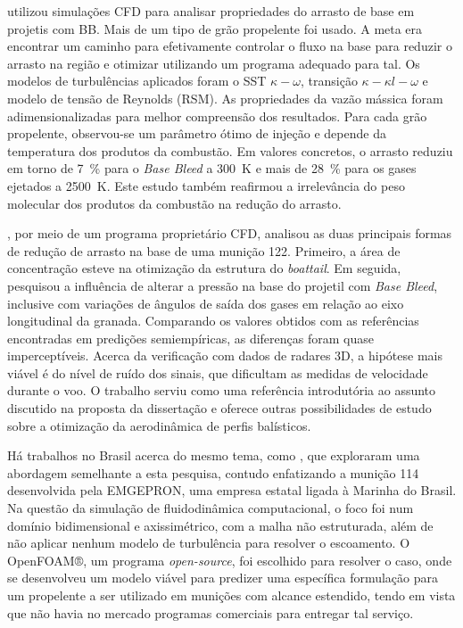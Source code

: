 \citeauthor{Dali2018a} utilizou simulações CFD para analisar propriedades do arrasto de base em projetis com BB. Mais de um tipo de grão propelente foi usado. A meta era encontrar um caminho para efetivamente controlar o fluxo na base para reduzir o arrasto na região e otimizar utilizando um programa adequado para tal. Os modelos de turbulências aplicados foram o SST \(\kappa-\omega\), transição \(\kappa-\kappa l-\omega\) e modelo de tensão de Reynolds (RSM). As propriedades da vazão mássica foram adimensionalizadas para melhor compreensão dos resultados. Para cada grão propelente, observou-se um parâmetro ótimo de injeção e depende da temperatura dos produtos da combustão. Em valores concretos, o arrasto reduziu em torno de \qty{7}{\percent} para o \textit{Base Bleed} a \qty{300}{\kelvin} e mais de \qty{28}{\percent} para os gases ejetados a \qty{2500}{\kelvin}. Este estudo também reafirmou a irrelevância do peso molecular dos produtos da combustão na redução do arrasto.
	
\citeauthor{Dali2018b}, por meio de um programa proprietário CFD, analisou as duas principais formas de redução de arrasto na base de uma munição \qty{122}{\millimetre}. Primeiro, a área de concentração esteve na otimização da estrutura do \textit{boattail}. Em seguida, pesquisou a influência de alterar a pressão na base do projetil com \textit{Base Bleed}, inclusive com variações de ângulos de saída dos gases em relação ao eixo longitudinal da granada. Comparando os valores obtidos com as referências encontradas em predições semiempíricas, as diferenças foram quase imperceptíveis. Acerca da verificação com dados de radares 3D, a hipótese mais viável é do nível de ruído dos sinais, que dificultam as medidas de velocidade durante o voo. O trabalho serviu como uma referência introdutória ao assunto discutido na proposta da dissertação e oferece outras possibilidades de estudo sobre a otimização da aerodinâmica de perfis balísticos. 
	
Há trabalhos no Brasil acerca do mesmo tema, como \cite{Lucena2020,Rosendo2020,Gil2020}, que exploraram uma abordagem semelhante a esta pesquisa, contudo enfatizando a munição \qty{114}{\millimetre} desenvolvida pela EMGEPRON, uma empresa estatal ligada à Marinha do Brasil. Na questão da simulação de fluidodinâmica computacional, o foco foi num domínio bidimensional e axissimétrico, com a malha não estruturada, além de não aplicar nenhum modelo de turbulência para resolver o escoamento. O OpenFOAM®, um programa \textit{open-source}, foi escolhido para resolver o caso, onde se desenvolveu um modelo viável para predizer uma específica formulação para um propelente a ser utilizado em munições com alcance estendido, tendo em vista que não havia no mercado programas comerciais para entregar tal serviço. 

